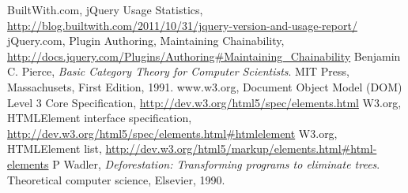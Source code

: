 \documentclass[preprint]{sigplanconf}
\begin{document}
\begin{thebibliography}{}
\softraggedright

  BuiltWith.com,
  jQuery Usage Statistics,
  \url{http://blog.builtwith.com/2011/10/31/jquery-version-and-usage-report/}
  jQuery.com,
  Plugin Authoring,
  Maintaining Chainability,
  \url{http://docs.jquery.com/Plugins/Authoring#Maintaining_Chainability}
  Benjamin C. Pierce,
  \emph{Basic Category Theory for Computer Scientists}.
  MIT Press, Massachusets,
  First Edition,
  1991.
  www.w3.org,
  Document Object Model (DOM) Level 3 Core Specification,
  \url{http://dev.w3.org/html5/spec/elements.html}
  W3.org,
  HTMLElement interface specification,
  \url{http://dev.w3.org/html5/spec/elements.html#htmlelement}
  W3.org,
  HTMLElement list,
  \url{http://dev.w3.org/html5/markup/elements.html#html-elements}
  P Wadler,
  \emph{Deforestation: Transforming programs to eliminate trees}.
  Theoretical computer science,
  Elsevier,
  1990.

\end{thebibliography}
\end{document}
